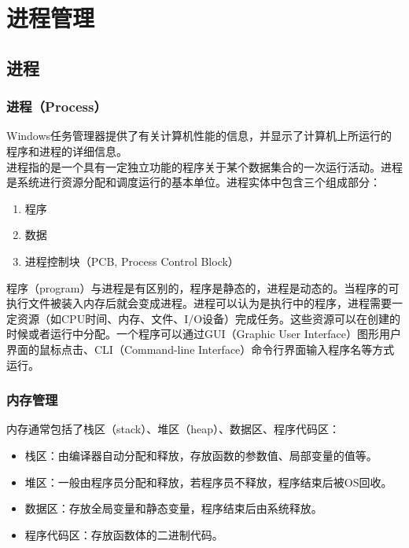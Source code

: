 \chapter{进程管理}

\section{进程}

\subsection{进程（Process）}

Windows任务管理器提供了有关计算机性能的信息，并显示了计算机上所运行的程序和进程的详细信息。\\

进程指的是一个具有一定独立功能的程序关于某个数据集合的一次运行活动。进程是系统进行资源分配和调度运行的基本单位。进程实体中包含三个组成部分：

\begin{enumerate}
    \item 程序
    \item 数据
    \item 进程控制块（PCB, Process Control Block）
\end{enumerate}

程序（program）与进程是有区别的，程序是静态的，进程是动态的。当程序的可执行文件被装入内存后就会变成进程。进程可以认为是执行中的程序，进程需要一定资源（如CPU时间、内存、文件、I/O设备）完成任务。这些资源可以在创建的时候或者运行中分配。一个程序可以通过GUI（Graphic User Interface）图形用户界面的鼠标点击、CLI（Command-line Interface）命令行界面输入程序名等方式运行。\\

\subsection{内存管理}

内存通常包括了栈区（stack）、堆区（heap）、数据区、程序代码区：

\begin{itemize}
    \item 栈区：由编译器自动分配和释放，存放函数的参数值、局部变量的值等。

    \item 堆区：一般由程序员分配和释放，若程序员不释放，程序结束后被OS回收。

    \item 数据区：存放全局变量和静态变量，程序结束后由系统释放。

    \item 程序代码区：存放函数体的二进制代码。
\end{itemize}

